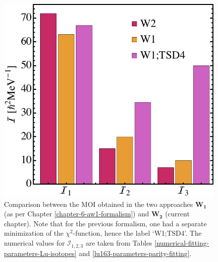 \begin{figure}
    \centering
    \includegraphics[scale=0.9]{Chapters/Figures/parity-partners-plots/W1-W2-Mois.pdf}
    \caption{Comparison between the MOI obtained in the two approaches $\mathbf{W_1}$ (as per Chapter \ref{chapter-6-aw1-formalism}) and $\mathbf{W_2}$ (current chapter). Note that for the previous formalism, one had a separate minimization of the $\chi^2$-function, hence the label `W1;TSD4'. The numerical values for $\mathcal{I}_{1,2,3}$ are taken from Tables \ref{numerical-fitting-parameters-Lu-isotopes} and \ref{lu163-parameters-parity-fitting}.}
    \label{moi-comparison-w1-w2-formalisms}
\end{figure}

